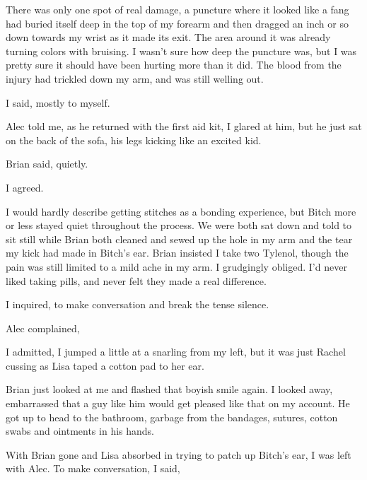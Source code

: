 There was only one spot of real damage, a puncture where it looked like a fang had buried itself deep in the top of my forearm and then dragged an inch or so down towards my wrist as it made its exit. The area around it was already turning colors with bruising. I wasn't sure how deep the puncture was, but I was pretty sure it should have been hurting more than it did. The blood from the injury had trickled down my arm, and was still welling out.

 I said, mostly to myself.

 Alec told me, as he returned with the first aid kit,  I glared at him, but he just sat on the back of the sofa, his legs kicking like an excited kid.

 Brian said, quietly.

 I agreed.

I would hardly describe getting stitches as a bonding experience, but Bitch more or less stayed quiet throughout the process. We were both sat down and told to sit still while Brian both cleaned and sewed up the hole in my arm and the tear my kick had made in Bitch's ear. Brian insisted I take two Tylenol, though the pain was still limited to a mild ache in my arm. I grudgingly obliged. I'd never liked taking pills, and never felt they made a real difference.

 I inquired, to make conversation and break the tense silence.

Alec complained, 

 I admitted,  I jumped a little at a snarling from my left, but it was just Rachel cussing as Lisa taped a cotton pad to her ear.

Brian just looked at me and flashed that boyish smile again. I looked away, embarrassed that a guy like him would get pleased like that on my account. He got up to head to the bathroom, garbage from the bandages, sutures, cotton swabs and ointments in his hands.

With Brian gone and Lisa absorbed in trying to patch up Bitch's ear, I was left with Alec. To make conversation, I said, 

